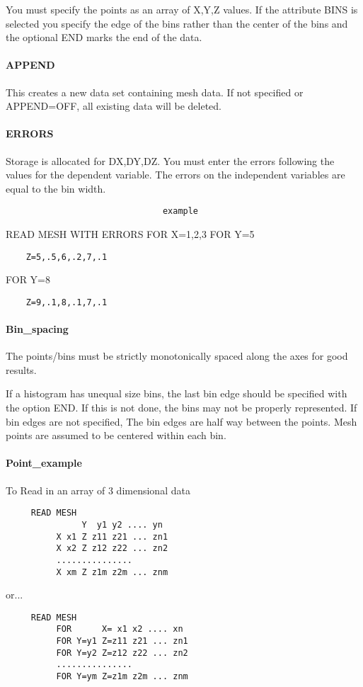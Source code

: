 You  must  specify  the  points  as  an  array of X,Y,Z values.  If the
attribute BINS is selected you specify the edge of the bins rather than
the center of the bins and the optional END marks the end of the data. 
\paragraph{APPEND}
This  creates  a new data set containing mesh data.  If not specified
or APPEND=OFF, all existing data will be deleted.  
\paragraph{ERRORS}
Storage  is  allocated  for  DX,DY,DZ.   You  must  enter  the errors
following the values for the dependent variable.  The errors  on  the
independent variables are equal to the bin width.  

\begin{verbatim}
                               example
\end{verbatim}
READ MESH WITH ERRORS
FOR X=1,2,3
FOR Y=5
\begin{verbatim}
    Z=5,.5,6,.2,7,.1
\end{verbatim}
FOR Y=8
\begin{verbatim}
    Z=9,.1,8,.1,7,.1
\end{verbatim}
\paragraph{Bin\_spacing}
The  points/bins must be strictly monotonically spaced along the axes
for good results.  

If  a  histogram  has  unequal size bins, the last bin edge should be
specified with the option END.  If this is not done, the bins may not
be  properly  represented.   If  bin edges are not specified, The bin
edges are half way between the points.  Mesh points are assumed to be
centered within each bin.  
\paragraph{Point\_example}
To Read in an array of 3 dimensional data 
\begin{verbatim}
     READ MESH 
               Y  y1 y2 .... yn 
          X x1 Z z11 z21 ... zn1 
          X x2 Z z12 z22 ... zn2 
          ...............  
          X xm Z z1m z2m ... znm 
\end{verbatim}

or...  
\begin{verbatim}
     READ MESH 
          FOR      X= x1 x2 .... xn 
          FOR Y=y1 Z=z11 z21 ... zn1 
          FOR Y=y2 Z=z12 z22 ... zn2 
          ...............  
          FOR Y=ym Z=z1m z2m ... znm 
\end{verbatim}
